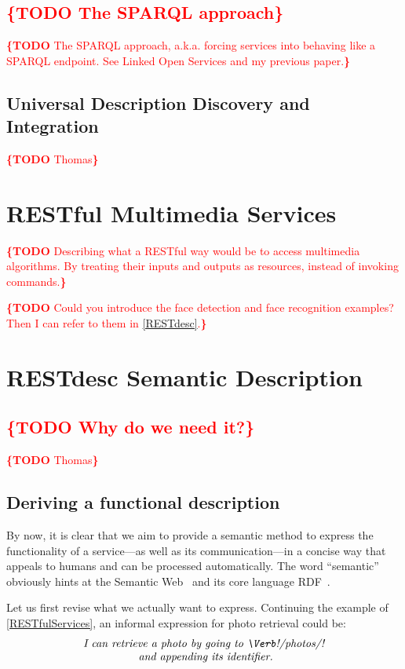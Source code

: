 \documentclass[runningheads,a4paper, twocolumn]{llncs}
\newcommand{\todo}[1]{\noindent\textcolor{red}{{\bf \{TODO} #1{\bf \}}}}
\begin{document}
\subsection{\todo{The SPARQL approach}}
\todo{The SPARQL approach, a.k.a. forcing services into behaving like a SPARQL endpoint. See Linked Open Services and my previous paper.}

\subsection{Universal Description Discovery and Integration}
\todo{Thomas}

\section{RESTful Multimedia Services}
\label{RESTfulServices}
\todo{Describing what a RESTful way would be to access multimedia algorithms. By treating their inputs and outputs as resources, instead of invoking commands.}

\todo{Could you introduce the face detection and face recognition examples? Then I can refer to them in \autoref{RESTdesc}.}

\section{RESTdesc Semantic Description}
\label{RESTdesc}
\subsection{\todo{Why do we need it?}}
\todo{Thomas}

\subsection{Deriving a functional description}
By now, it is clear that we aim to provide a semantic method to express the functionality of a service---as well as its communication---in a concise way that appeals to humans and can be processed automatically. The word ``semantic'' obviously hints at the Semantic Web~\cite{SemanticWeb} and its core language RDF~\cite{RDF}.

Let us first revise what we actually want to express. Continuing the example of \autoref{RESTfulServices}, an informal expression for photo retrieval could be:
\begin{multline}\label{eq:Informal}
	\textit{I can retrieve a photo by going to \Verb!/photos/!}\\[-.3em]
	\textit{ and appending its identifier.}
\end{multline}
\end{document}
